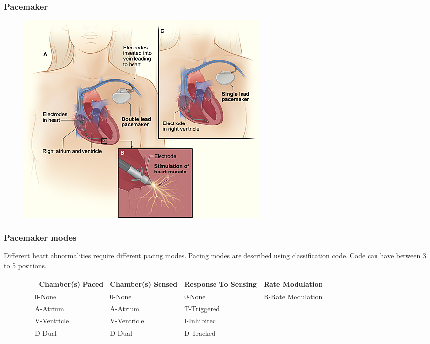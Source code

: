 \documentclass[xcolor=dvipsnames]{beamer}
\begin{document}
  \begin{frame}
    \frametitle{Pacemaker}
    \begin{figure}
      \begin{center}
        \includegraphics[width=1 \textwidth]{Figures/pacemaker.png}
      \end{center}
    \end{figure}
  \end{frame}

  \begin{frame}{}
    \frametitle{Pacemaker modes}
    Different heart abnormalities require different pacing modes. Pacing modes are described using classification code. Code can have between 3 to 5 positions.

    \begin{tabularx}{\textwidth}{|X|X|X|X|}
      \hline
              Chamber(s) Paced & Chamber(s) Sensed & Response To Sensing & Rate Modulation  \\ \hline
              0-None           & 0-None            & 0-None              & \multirow{2}{2cm}{R-Rate Modulation}  \\ %
              A-Atrium         & A-Atrium          & T-Triggered         &                    \\ %
              V-Ventricle      & V-Ventricle       & I-Inhibited         &                    \\ %
              D-Dual           & D-Dual            & D-Tracked           &                  \\
      \hline
    \end{tabularx}

  \end{frame}
\end{document}
